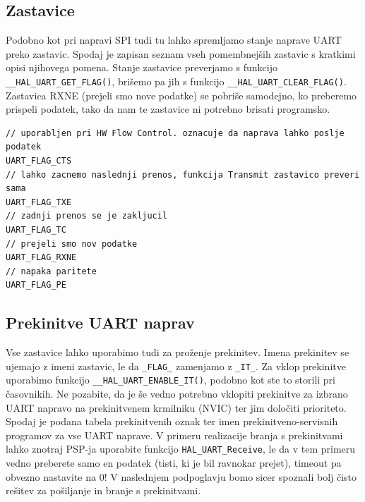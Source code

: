 \documentclass[12pt,letterpaper]{article}
\begin{document}
\subsection*{Zastavice}

Podobno kot pri napravi SPI tudi tu lahko spremljamo stanje naprave UART preko zastavic. Spodaj je zapisan seznam vseh pomembnejših zastavic s kratkimi opisi njihovega pomena. Stanje zastavice preverjamo s funkcijo \texttt{\_\_HAL\_UART\_GET\_FLAG()}, brišemo pa jih s funkcijo \texttt{\_\_HAL\_UART\_CLEAR\_FLAG()}. Zastavica RXNE (prejeli smo nove podatke) se pobriše samodejno, ko preberemo prispeli podatek, tako da nam te zastavice ni potrebno brisati programsko.

\begin{center}
\begin{lstlisting}[style=CStyle]
// uporabljen pri HW Flow Control. oznacuje da naprava lahko poslje podatek
UART_FLAG_CTS 
// lahko zacnemo naslednji prenos, funkcija Transmit zastavico preveri sama
UART_FLAG_TXE 
// zadnji prenos se je zakljucil
UART_FLAG_TC
// prejeli smo nov podatke
UART_FLAG_RXNE
// napaka paritete
UART_FLAG_PE
\end{lstlisting}
\end{center}

\subsection*{Prekinitve UART naprav}

Vse zastavice lahko uporabimo tudi za proženje prekinitev. Imena prekinitev se ujemajo z imeni zastavic, le da \texttt{\_FLAG\_} zamenjamo z \texttt{\_IT\_}. Za vklop prekinitve uporabimo funkcijo \texttt{\_\_HAL\_UART\_ENABLE\_IT()}, podobno kot ste to storili pri časovnikih. Ne pozabite, da je še vedno potrebno vklopiti prekinitve za izbrano UART napravo na prekinitvenem krmilniku (NVIC) ter jim določiti prioriteto. Spodaj je podana tabela prekinitvenih oznak ter imen prekinitveno-servisnih programov za vse UART naprave. V primeru realizacije branja s prekinitvami lahko znotraj PSP-ja uporabite funkcijo \texttt{HAL\_UART\_Receive}, le da v tem primeru vedno preberete samo en podatek (tisti, ki je bil ravnokar prejet), timeout pa obvezno nastavite na 0! V naslednjem podpoglavju bomo sicer spoznali bolj čisto rešitev za pošiljanje in branje s prekinitvami.
\end{document}
